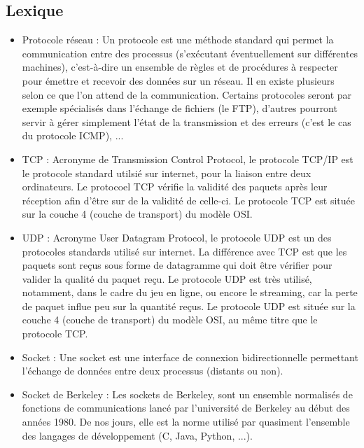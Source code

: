 \newpage
\begin{appendices}
\section{Lexique}
\begin{itemize}
	\item Protocole réseau :
    Un protocole est une méthode standard qui permet la communication entre des processus (s'exécutant éventuellement sur différentes machines), 
    c'est-à-dire un ensemble de règles et de procédures à respecter pour émettre et recevoir des données sur un réseau. 
    Il en existe plusieurs selon ce que l'on attend de la communication. Certains protocoles seront par exemple spécialisés dans l'échange de fichiers (le FTP), 
    d'autres pourront servir à gérer simplement l'état de la transmission et des erreurs (c'est le cas du protocole ICMP), ... 
\newline

	\item TCP : 
    Acronyme de Transmission Control Protocol, le protocole TCP/IP est le protocole standard utilsié sur internet, pour la liaison entre deux ordinateurs.
    Le protocoel TCP vérifie la validité des paquets après leur réception afin d'être sur de la validité de celle-ci. 
    Le protocole TCP est située sur la couche 4 (couche de transport) du modèle OSI. 
\newline

	\item UDP :
    Acronyme User Datagram Protocol, le protocole UDP est un des protocoles standards utilisé sur internet. 
    La différence avec TCP est que les paquets sont reçus sous forme de datagramme qui doit être vérifier pour valider la qualité du paquet reçu.
    Le protocole UDP est très utilisé, notamment, dans le cadre du jeu en ligne, ou encore le streaming, car la perte de paquet influe peu sur la quantité reçus.
    Le protocole UDP est située sur la couche 4 (couche de transport) du modèle OSI, au même titre que le protocole TCP. 
   \newline
 
	\item Socket :
    Une socket est une interface de connexion bidirectionnelle permettant l'échange de données entre deux processus (distants ou non).
   \newline
 
	\item Socket de Berkeley :
    Les sockets de Berkeley, sont un ensemble normalisés de fonctions de communications lancé par l'université de Berkeley au début des années 1980.
    De nos jours, elle est la norme utilisé par quasiment l'ensemble des langages de développement (C, Java, Python, ...).
  \newline
  

\end{itemize}
\end{appendices}
